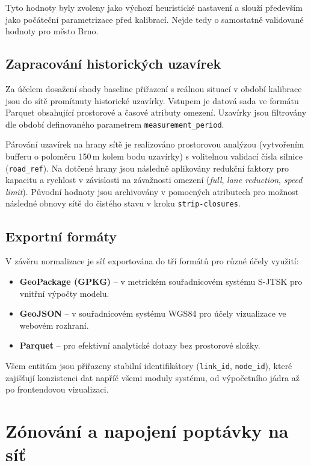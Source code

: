 Tyto hodnoty byly zvoleny jako výchozí heuristické nastavení a slouží především jako počáteční parametrizace před kalibrací. Nejde tedy o samostatně validované hodnoty pro město Brno.

\subsection{Zapracování historických uzavírek}
\label{sec:impl-network-closures}

Za účelem dosažení shody baseline přiřazení s reálnou situací v období kalibrace jsou do sítě promítnuty historické uzavírky. Vstupem je datová sada ve formátu Parquet obsahující prostorové a časové atributy omezení. Uzavírky jsou filtrovány dle období definovaného parametrem \texttt{measurement\_period}.

Párování uzavírek na hrany sítě je realizováno prostorovou analýzou (vytvořením bufferu o poloměru 150\,m kolem bodu uzavírky) s volitelnou validací čísla silnice (\texttt{road\_ref}). Na dotčené hrany jsou následně aplikovány redukční faktory pro kapacitu a rychlost v závislosti na závažnosti omezení (\textit{full}, \textit{lane reduction}, \textit{speed limit}). Původní hodnoty jsou archivovány v pomocných atributech pro možnost následné obnovy sítě do čistého stavu v kroku \texttt{strip-closures}.

\subsection{Exportní formáty}
\label{sec:impl-network-export}

V závěru normalizace je síť exportována do tří formátů pro různé účely využití:
\begin{itemize}
    \item \textbf{GeoPackage (GPKG)} -- v metrickém souřadnicovém systému S-JTSK pro vnitřní výpočty modelu.
    \item \textbf{GeoJSON} -- v souřadnicovém systému WGS84 pro účely vizualizace ve webovém rozhraní.
    \item \textbf{Parquet} -- pro efektivní analytické dotazy bez prostorové složky.
\end{itemize}
Všem entitám jsou přiřazeny stabilní identifikátory (\texttt{link\_id}, \texttt{node\_id}), které zajišťují konzistenci dat napříč všemi moduly systému, od výpočetního jádra až po frontendovou vizualizaci.


\section{Zónování a napojení poptávky na síť}
\label{sec:impl-zones}

